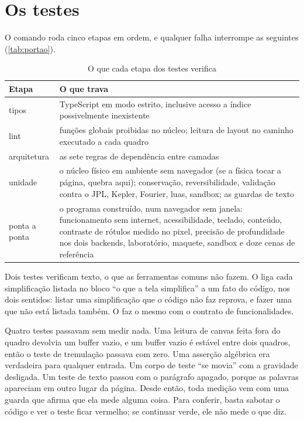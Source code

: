 \section{Os testes}

O comando  roda cinco etapas em ordem, e qualquer falha interrompe as seguintes (\autoref{tab:portao}).

\begin{table}[htb]
  \centering
  \caption{O que cada etapa dos testes verifica}
  \label{tab:portao}
  \begin{tabularx}{\textwidth}{lX}
    \toprule
    Etapa & O que trava \\
    \midrule
    tipos & TypeScript em modo estrito, inclusive acesso a índice possivelmente inexistente \\
    lint & funções globais proibidas no núcleo; leitura de layout no caminho executado a cada quadro \\
    arquitetura & as sete regras de dependência entre camadas \\
    unidade & o núcleo físico em ambiente sem navegador (se a física tocar a página, quebra aqui); conservação, reversibilidade, validação contra o JPL, Kepler, Fourier, luas, sandbox; as guardas de texto \\
    ponta a ponta & o programa construído, num navegador sem janela: funcionamento sem internet, acessibilidade, teclado, conteúdo, contraste de rótulos medido no pixel, precisão de profundidade nos dois backends, laboratório, maquete, sandbox e doze cenas de referência \\
    \bottomrule
  \end{tabularx}
\end{table}

Dois testes verificam texto, o que as ferramentas comuns não fazem. O  liga cada simplificação listada no bloco ``o que a tela simplifica'' a um fato do código, nos dois sentidos: listar uma simplificação que o código não faz reprova, e fazer uma que não está listada também. O  faz o mesmo com o contrato de funcionalidades.

\begin{licao}
Quatro testes passavam sem medir nada. Uma leitura de canvas feita fora do quadro devolvia um buffer vazio, e um buffer vazio é estável entre dois quadros, então o teste de tremulação passava com zero. Uma asserção algébrica era verdadeira para qualquer entrada. Um corpo de teste ``se movia'' com a gravidade desligada. Um teste de texto passou com o parágrafo apagado, porque as palavras apareciam em outro lugar da página. Desde então, toda medição vem com uma guarda que afirma que ela mede alguma coisa. Para conferir, basta sabotar o código e ver o teste ficar vermelho; se continuar verde, ele não mede o que diz.
\end{licao}

